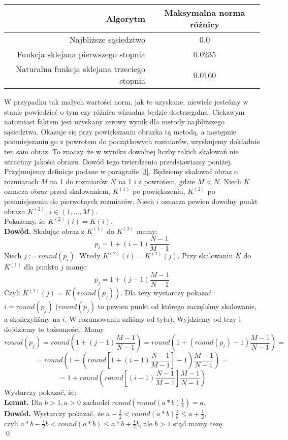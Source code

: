 \documentclass{mwart}
\theoremstyle{definition}
\begin{document}
\begin{tabular}{|r|c|}
  \hline 
  Algorytm & Maksymalna norma różnicy\\
  \hline
  Najbliższe sąsiedztwo & 0.0 \\
  \hline
  Funkcja sklejana pierwszego stopnia & 0.0235 \\
  \hline
  Naturalna funkcja sklejana trzeciego stopnia &  0.0160 \\
  \hline
\end{tabular}

\vspace{5mm}

 W przypadku tak małych wartości norm, jak te uzyskane, niewiele jesteśmy w stanie powiedzieć o tym czy różnica wizualna będzie dostrzegalna. Ciekawym natomiast faktem jest uzyskany zerowy wynik dla metody najbliższego sąsiedztwa. Okazuje się przy powiększaniu obrazka tą metodą, a następnie pomniejszaniu go z powrotem do początkowych rozmiarów, uzyskujemy dokładnie ten sam obraz. To znaczy, że w wyniku dowolnej liczby takich skalowań nie utracimy jakości obrazu. Dowód tego twierdzenia przedstawiamy poniżej. \\
\indent Przyjmujemy definicje podane w paragrafie \hyperref[sec:metoda]{[3]}. Będziemy skalować obraz o rozmiarach $M$ na 1 do rozmiarów $N$ na 1 i z powrotem, gdzie $M<N$. Niech $K$ oznacza obraz przed skalowaniem, $K^{(1)}$ po powiększeniu, $K^{(2)}$ po pomniejszeniu do pierwotnych rozmiarów. Niech $i$ oznacza pewien dowolny punkt obrazu $K^{(2)}$, $i \in (1,\dots,M)$. \\
Pokażemy, że $K^{(2)}(i)=K(i)$. \\
\textbf{Dowód.}
Skalując obraz z $K^{(1)}$ do $K^{(2)}$ mamy:
$$p_i = 1 + (i-1)\frac{N-1}{M-1}$$
Niech $j := round(p_i)$. Wtedy $K^{(2)}(i)=K^{(1)}(j)$. Przy skalowaniu $K$ do $K^{(1)}$ dla punktu $j$ mamy:
$$p_j = 1 + (j-1)\frac{M-1}{N-1}$$
Czyli $K^{(1)}(j) = K(round(p_j))$. Dla tezy wystarczy pokazać $i = round(p_j)$ ($round(p_j)$ to pewien punkt od którego zaczęliśmy skalowanie, a skończyliśmy na $i$. W rozumowaniu szliśmy od tyłu).
Wyjdziemy od tezy i dojdziemy to tożsamości. Mamy
$$round(p_j) = round(1 + (j-1)\frac{M-1}{N-1}) = round(1 + (round(p_i)-1)\frac{M-1}{N-1}) = $$
$$ = round(1 + (round[1 + (i-1)\frac{N-1}{M-1}]-1)\frac{M-1}{N-1})  = $$
$$ = 1 + round(round[(i-1)\frac{N-1}{M-1}]\frac{M-1}{N-1}) $$
Wystarczy pokazać, że: \\
\textbf{Lemat.} Dla $b>1, a>0$ zachodzi $round(round(a*b)\frac{1}{b}) = a$. \\
\textbf{Dowód.} Wystarczy pokazać, że $a-\frac{1}{2}<round(a*b)\frac{1}{b}\leq a+\frac{1}{2}$, \\
czyli $a*b-\frac{1}{2}b < round(a*b) \leq a*b + \frac{1}{2}b$, ale $b>1$ stąd mamy tezę.\\ \qed
\end{document}
